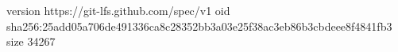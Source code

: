 version https://git-lfs.github.com/spec/v1
oid sha256:25add05a706de491336ca8c28352bb3a03e25f38ac3eb86b3cbdeee8f4841fb3
size 34267
